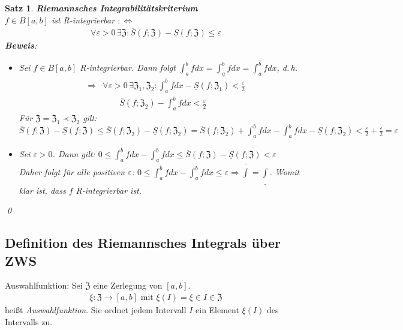 \documentclass[ngerman,titlepage,twoside, parskip=half*]{scrreprt}
\newcommand*{\ZZ}{\mathfrak{Z}}
\newcommand*{\perdef}{:\Leftrightarrow}
\theoremstyle{break}
\newtheorem{theorem}{Satz}[section]
\theoremstyle{nonumberbreak}
\begin{document}
\begin{theorem}
  \textbf{Riemannsches Integrabilitätskriterium}\\
  $f\in B[a,b]$ ist R-integrierbar $\perdef$
  \begin{gather*}\forall \varepsilon>0\,\exists \ZZ \colon \overline{S}(f;\ZZ)-
  \underline{S}(f;\ZZ)\leq \varepsilon\end{gather*}
  \textbf{Beweis}:
  \begin{itemize}
    \item["`$\Rightarrow$"'] Sei $f\in B[a,b]$ R-integrierbar. Dann folgt
      $\int_a^b fdx=\int_{\underline{a}}^b fdx = \int_a^{\overline{b}} fdx$,
      d.\,h.
      \begin{align}
        &\Rightarrow& \forall\varepsilon>0\,\exists\ZZ_1,\ZZ_2\colon\int_a^b fdx
        -\underline{S}(f;\ZZ_1)<\frac{\varepsilon}{2}\\
        & & \qquad \overline{S}(f;\ZZ_2)-\int_a^b fdx < \frac{\varepsilon}{2}
      \end{align}
      Für $\ZZ=\ZZ_1\prec\ZZ_2$ gilt: $\overline{S}(f;\ZZ)-\underline{S}(f;\ZZ)
      \leq \overline{S}(f;\ZZ_2)-\underline{S}(f;\ZZ_2) = 
      \overline{S}(f;\ZZ_2)+\int_a^b fdx-\int_a^b fdx-\underline{S}(f;\ZZ_2)
      <\frac{\varepsilon}{2}+\frac{\varepsilon}{2}=\varepsilon$
    \item["`$\Leftrightarrow$"'] Sei $\varepsilon>0$. Dann gilt: $0\leq
      \int_a^{\overline{b}} fdx - \int_{\underline{a}}^b fdx\leq
      \overline{S}(f;\ZZ)-\underline{S}(f;\ZZ)<\varepsilon$\\
      Daher folgt für alle positiven $\varepsilon$: $0\leq
      \int_a^{\overline{b}} fdx - \int_{\underline{a}}^b fdx\leq \varepsilon
      \Rightarrow \overline{\int}=\underline{\int}$. Womit klar ist, dass $f$ 
      R-integrierbar ist.
  \end{itemize}
  \qed
\end{theorem}

\subsection{Definition des Riemannsches Integrals über ZWS}

Auswahlfunktion: Sei $\ZZ$ eine Zerlegung von $[a,b]$.
\begin{gather*}\xi\colon\ZZ\rightarrow[a,b] \text{ mit } \xi(I)=\xi\in I\in\ZZ\end{gather*}
heißt \emph{Auswahlfunktion}. Sie ordnet jedem
Intervall $I$ ein Element $\xi(I)$ des Intervalls zu.
\end{document}
